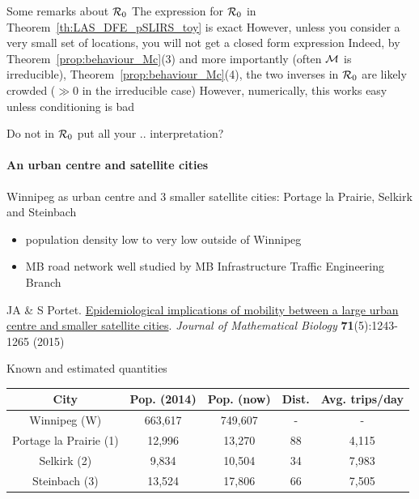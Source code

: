 \documentclass[aspectratio=43]{beamer}
\begin{document}
\begin{frame}{Some remarks about $\mathcal{R}_0$}
	The expression for $\mathcal{R}_0$ in Theorem~\ref{th:LAS_DFE_pSLIRS_toy} is exact
	\vfill
	However, unless you consider a very small set of locations, you will not get a closed form expression
	\vfill
	Indeed, by Theorem~\ref{prop:behaviour_Mc}{(3)} and more importantly (often $\mathcal{M}$ is irreducible), Theorem~\ref{prop:behaviour_Mc}{(4)}, the two inverses in $\mathcal{R}_0$ are likely crowded ($\gg 0$ in the irreducible case)
	\vfill
	However, numerically, this works easy unless conditioning is bad
\end{frame}


\begin{frame}{Do not in $\mathcal{R}_0$ put all your .. interpretation?}
\framesubtitle{An urban centre and satellite cities}
Winnipeg as urban centre and 3 smaller satellite cities: Portage la Prairie, Selkirk and Steinbach
\begin{itemize}
	\item population density low to very low outside of Winnipeg
	\item MB road network well studied by MB Infrastructure Traffic Engineering Branch
\end{itemize}
\vfill
JA \& S Portet. \href{https://julien-arino.github.io/assets/pdf/papers/2015_ArinoPortet-JMB71.pdf}{Epidemiological implications of mobility between a large urban centre and smaller satellite cities}. \emph{Journal of Mathematical Biology} \textbf{71}(5):1243-1265 (2015)
\end{frame}


\begin{frame}{Known and estimated quantities}
\begin{center}
	\begin{tabular}{c|c|c|c|c}
		City & Pop. (2014) & Pop. (now) & Dist. & Avg. trips/day \\
		\hline
		Winnipeg (W) & 663,617 & 749,607 & - & - \\
		Portage la Prairie (1) & 12,996 & 13,270 & 88 & 4,115 \\
		Selkirk (2) & 9,834 & 10,504 & 34 & 7,983 \\
		Steinbach (3) & 13,524 & 17,806 & 66 & 7,505
	\end{tabular}
\end{center}
\end{frame}	

\end{document}
